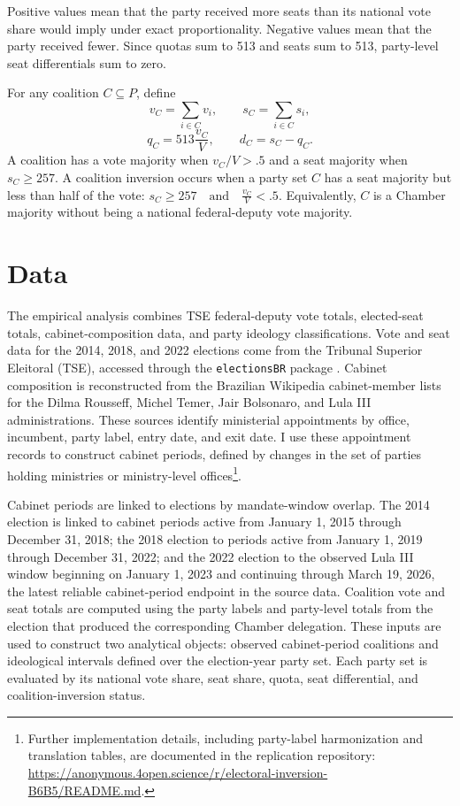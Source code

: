 \documentclass[11pt]{article}
\newcommand{\Quota}{q}
\newcommand{\Diff}{d}
\newcommand{\Parties}{P}
\begin{document}
Positive values mean that the party received more seats than its national vote
share would imply under exact proportionality. Negative values mean that the
party received fewer. Since quotas sum to 513 and seats sum to 513, party-level
seat differentials sum to zero.

For any coalition $C \subseteq \Parties$, define
\[
  v_C = \sum_{i\in C} v_i, \qquad s_C = \sum_{i\in C} s_i,
\]
\[
  \Quota_C = 513\frac{v_C}{V}, \qquad \Diff_C = s_C - \Quota_C.
\]
A coalition has a vote majority when $v_C/V > .5$ and a seat majority when
$s_C \geq 257$. A coalition inversion occurs when a party set $C$ has a seat majority but less than half of the vote: \(s_C \geq 257 \quad \text{and} \quad \frac{v_C}{V} < .5.\)
Equivalently, $C$ is a Chamber majority without being a national federal-deputy
vote majority.


\section{Data}
\label{sec:data}

The empirical analysis combines TSE federal-deputy vote totals, elected-seat
totals, cabinet-composition data, and party ideology classifications. Vote and
seat data for the 2014, 2018, and 2022 elections come from the Tribunal Superior
Eleitoral (TSE), accessed through the \texttt{electionsBR} package
\parencite{electionsbr}. Cabinet composition is reconstructed from the
Brazilian Wikipedia cabinet-member lists for the Dilma Rousseff, Michel Temer,
Jair Bolsonaro, and Lula III administrations. These sources identify ministerial
appointments by office, incumbent, party label, entry date, and exit date. I use
these appointment records to construct cabinet periods, defined by changes in
the set of parties holding ministries or ministry-level offices\footnote{Further
  implementation details, including party-label harmonization and translation
  tables, are documented in the replication repository: \url{https://anonymous.4open.science/r/electoral-inversion-B6B5/README.md}.}.

Cabinet periods are linked to elections by mandate-window overlap. The 2014
election is linked to cabinet periods active from January 1, 2015 through
December 31, 2018; the 2018 election to periods active from January 1, 2019
through December 31, 2022; and the 2022 election to the observed Lula III window
beginning on January 1, 2023 and continuing through March 19, 2026, the latest reliable cabinet-period endpoint in the source data. Coalition vote and seat totals are computed using the party labels and
party-level totals from the election that produced the corresponding Chamber
delegation. These inputs are used to construct two analytical objects:
observed cabinet-period coalitions and ideological intervals defined over the
election-year party set.
Each party set is evaluated by its national vote share, seat share, quota, seat
differential, and coalition-inversion status.
\end{document}
